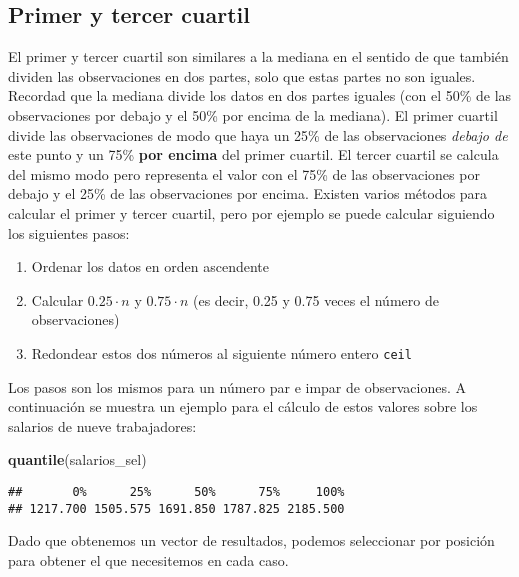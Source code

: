 \documentclass[
]{book}
\newenvironment{Shaded}{\begin{snugshade}}{\end{snugshade}}
\newcommand{\KeywordTok}[1]{\textcolor[rgb]{0.13,0.29,0.53}{\textbf{#1}}}
\newcommand{\NormalTok}[1]{#1}
\providecommand{\tightlist}{%
  \setlength{\itemsep}{0pt}\setlength{\parskip}{0pt}}
\begin{document}
\hypertarget{primer-y-tercer-cuartil}{%
\subsection{Primer y tercer cuartil}\label{primer-y-tercer-cuartil}}

El primer y tercer cuartil son similares a la mediana en el sentido de que también dividen las observaciones en dos partes, solo que estas partes no son iguales. Recordad que la mediana divide los datos en dos partes iguales (con el 50\% de las observaciones por debajo y el 50\% por encima de la mediana). El primer cuartil divide las observaciones de modo que haya un 25\% de las observaciones \emph{debajo de} este punto y un 75\% \textbf{por encima} del primer cuartil. El tercer cuartil se calcula del mismo modo pero representa el valor con el 75\% de las observaciones por debajo y el 25\% de las observaciones por encima. Existen varios métodos para calcular el primer y tercer cuartil, pero por ejemplo se puede calcular siguiendo los siguientes pasos:

\begin{enumerate}
\def\labelenumi{\arabic{enumi}.}
\tightlist
\item
  Ordenar los datos en orden ascendente
\item
  Calcular \(0.25\cdot n\) y \(0.75\cdot n\) (es decir, 0.25 y 0.75 veces el número de observaciones)
\item
  Redondear estos dos números al siguiente número entero \texttt{ceil}
\end{enumerate}

Los pasos son los mismos para un número par e impar de observaciones. A continuación se muestra un ejemplo para el cálculo de estos valores sobre los salarios de nueve trabajadores:

\begin{Shaded}
\begin{Highlighting}[]
\KeywordTok{quantile}\NormalTok{(salarios_sel)}
\end{Highlighting}
\end{Shaded}

\begin{verbatim}
##       0%      25%      50%      75%     100% 
## 1217.700 1505.575 1691.850 1787.825 2185.500
\end{verbatim}

Dado que obtenemos un vector de resultados, podemos seleccionar por posición para obtener el que necesitemos en cada caso.
\end{document}
